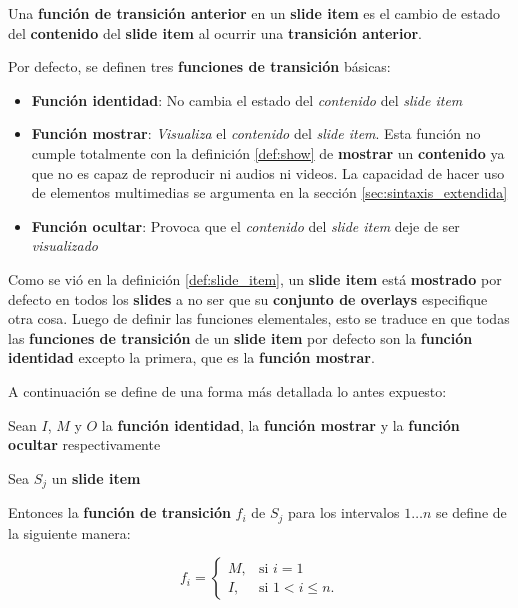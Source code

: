 		\begin{definition}
		\label{def:prev_transition_func}
			Una \textbf{función de transición anterior} en un \textbf{slide item} es el cambio de estado del \textbf{contenido} del \textbf{slide item} al ocurrir una \textbf{transición anterior}.
		\end{definition}

		Por defecto, se definen tres \textbf{funciones de transición} básicas:
		\begin{itemize}
			\item \textbf{Función identidad}: No cambia el estado del \textit{contenido} del \textit{slide item}
			\item \textbf{Función mostrar}: \textit{Visualiza} el \textit{contenido} del \textit{slide item}. Esta función no cumple totalmente con la definición \ref{def:show} de \textbf{mostrar} un \textbf{contenido} ya que no es capaz de reproducir ni audios ni videos. La capacidad de hacer uso de elementos multimedias se argumenta en la sección \ref{sec:sintaxis_extendida} 
			\item \textbf{Función ocultar}: Provoca que el \textit{contenido} del \textit{slide item} deje de ser \textit{visualizado}
		\end{itemize}

		Como se vió en la definición \ref{def:slide_item}, un \textbf{slide item} está \textbf{mostrado} por defecto en todos los \textbf{slides} a no ser que su \textbf{conjunto de overlays} especifique otra cosa. Luego de definir las funciones elementales, esto se traduce en que todas las \textbf{funciones de transición} de un \textbf{slide item} por defecto son la \textbf{función identidad} excepto la primera, que es la \textbf{función mostrar}. 

		A continuación se define de una forma más detallada lo antes expuesto:

 		Sean \( I \), \( M \) y \( O \) la \textbf{función identidad}, la \textbf{función mostrar} y la \textbf{función ocultar} respectivamente


        Sea \( S_j \) un \textbf{slide item}

        Entonces la \textbf{función de transición} \( f_i \) de \( S_j \) para los intervalos \( 1 \dots n \) se define de la siguiente manera:


		\begin{equation}
		\label{eq:default}
			f_i = 
			\begin{cases}
				M, & \mbox{si }i = 1 \\
				I, & \mbox{si }1 < i \leq n.
			\end{cases}
		\end{equation}

